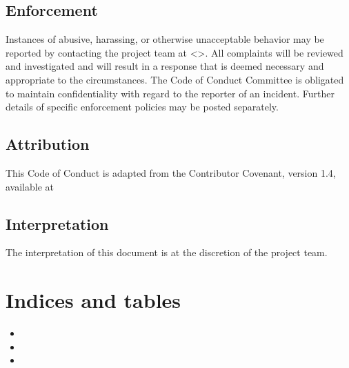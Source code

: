 \documentclass[letterpaper,10pt,english]{sphinxmanual}
\begin{document}
\section{Enforcement}
\label{\detokenize{Code-of-conduct:enforcement}}
\sphinxAtStartPar
Instances of abusive, harassing, or otherwise unacceptable behavior may be
reported by contacting the project team at \textless{}\textgreater{}.
All complaints will be reviewed and investigated
and will result in a response that is deemed necessary and appropriate
to the circumstances. The Code of Conduct Committee is obligated to
maintain confidentiality with regard to the reporter of an incident.
Further details of specific enforcement policies may be posted
separately.


\section{Attribution}
\label{\detokenize{Code-of-conduct:attribution}}
\sphinxAtStartPar
This Code of Conduct is adapted from the Contributor Covenant, version 1.4,
available at 


\section{Interpretation}
\label{\detokenize{Code-of-conduct:interpretation}}
\sphinxAtStartPar
The interpretation of this document is at the discretion of the project team.


\chapter{Indices and tables}
\label{\detokenize{index:indices-and-tables}}\begin{itemize}
\item {} 
\sphinxAtStartPar
{}

\item {} 
\sphinxAtStartPar
{}

\item {} 
\sphinxAtStartPar
{}

\end{itemize}



\renewcommand{\indexname}{Index}
\printindex
\end{document}

